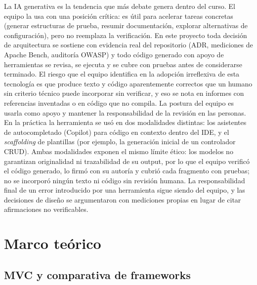 \documentclass[12pt,a4paper]{article}
\begin{document}
La IA generativa es la tendencia que más debate genera dentro del curso. El equipo la
usa con una posición crítica: es útil para acelerar tareas concretas (generar
estructuras de prueba, resumir documentación, explorar alternativas de configuración),
pero no reemplaza la verificación. En este proyecto toda decisión de arquitectura se
sostiene con evidencia real del repositorio (ADR, mediciones de Apache Bench, auditoría
OWASP) y todo código generado con apoyo de herramientas se revisa, se ejecuta y se cubre
con pruebas antes de considerarse terminado. El riesgo que el equipo identifica en la
adopción irreflexiva de esta tecnología es que produce texto y código aparentemente
correctos que un humano sin criterio técnico puede incorporar sin verificar, y eso se
nota en informes con referencias inventadas o en código que no compila. La postura del
equipo es usarla como apoyo y mantener la responsabilidad de la revisión en las
personas. En la práctica la herramienta se usó en dos modalidades distintas: los
asistentes de autocompletado (Copilot) para código en contexto dentro del IDE, y el
\textit{scaffolding} de plantillas (por ejemplo, la generación inicial de un controlador
CRUD). Ambas modalidades exponen el mismo límite ético: los modelos no garantizan
originalidad ni trazabilidad de su output, por lo que el equipo verificó el código
generado, lo firmó con su autoría y cubrió cada fragmento con pruebas; no se incorporó
ningún texto ni código sin revisión humana. La responsabilidad final de un error
introducido por una herramienta sigue siendo del equipo, y las decisiones de diseño se
argumentaron con mediciones propias en lugar de citar afirmaciones no verificables.

\newpage

\section{Marco teórico}

\subsection{MVC y comparativa de frameworks}
\end{document}
